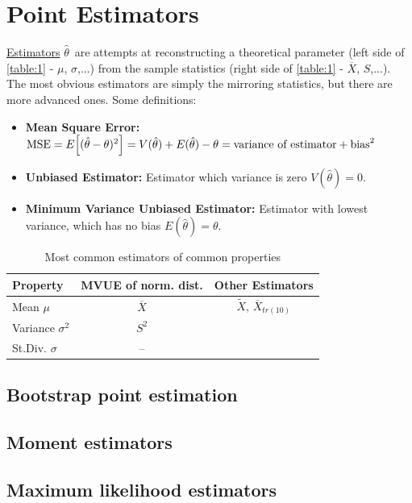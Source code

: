 \documentclass[12p,a4paper]{report}
\renewcommand{\bar}{\overline}
\begin{document}
\section*{Point Estimators}
\underline{Estimators} $\hat{\theta}$ are attempts at reconstructing a theoretical parameter (left side of \ref{table:1} - $\mu$, $\sigma$,...) from the sample statistics (right side of \ref{table:1} - $\bar{X}$, $S$,...). The most obvious estimators are simply the mirroring statistics, but there are more advanced ones.
Some definitions:
\begin{itemize}
    \item \textbf{Mean Square Error:} $\text{MSE} = E\qty[(\hat{\theta} - \theta)^2] = V(\hat{\theta}) + E(\hat{\theta}) - \theta = \text{variance of estimator} + \text{bias}^2$
    \item \textbf{Unbiased Estimator:} Estimator which variance is zero $V(\hat{\theta}) = 0$.
    \item \textbf{Minimum Variance Unbiased Estimator:} Estimator with lowest variance, which has no bias $E(\hat{\theta}) = \theta$.
\end{itemize}

\begin{table}[H]
    \centering
    \begin{tabular}{l | c | c }
        \textbf{Property}    &  \textbf{MVUE of norm. dist.}  & Other Estimators \\ \midrule
        Mean $\mu$           & $\bar{X}$       & $\tilde{X}$, $\bar{X}_{tr(10)}$ \\ \midrule
        Variance $\sigma^2$  & $S^2$           & \\ \midrule
        St.Div. $\sigma$     & --              &
    \end{tabular}
    \caption{Most common estimators of common properties}
    \label{table:2}
\end{table}

\subsection*{Bootstrap point estimation}
\subsection*{Moment estimators}
\subsection*{Maximum likelihood estimators}
\end{document}
